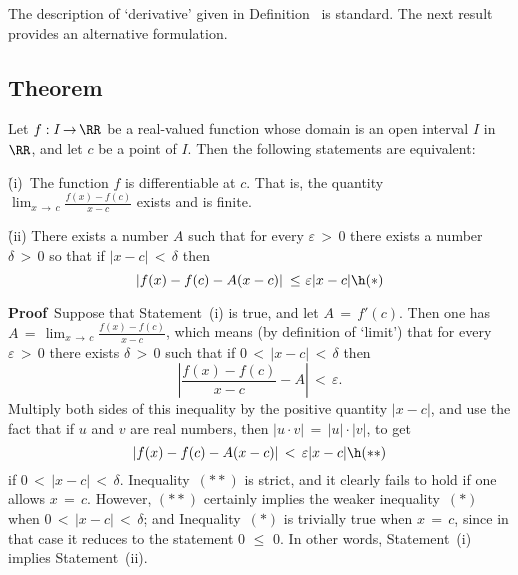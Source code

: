         The description of `derivative' given in Definition~ is standard.
    The next result provides an alternative formulation.

\V

             \subsection{\small{\bf Theorem}}
            \label{ThmE55.20}

        Let $f:I \,{\rightarrow}\, {\RR}$ be a real-valued function whose domain is an open interval $I$ in ${\RR}$, and let $c$ be a point of $I$.
    Then the following statements are equivalent:

        \h (i)\, The function $f$ is differentiable at $c$. That is, the quantity ${\displaystyle \lim_{x \,{\rightarrow}\, c} \frac{f(x)-f(c)}{x-c}}$ exists and is finite.

        \h (ii) There exists a number $A$ such that for every ${\varepsilon}\,>\,0$ there exists a number ${\delta}\,>\,0$ so that if $|x-c|\,<\,{\delta}$ then
        \begin{displaymath}
        \left|f(x) - f(c) - A(x-c)\right|\,\,{\leq}\,\,{\varepsilon}|x-c| \h ({\ast})
        \end{displaymath}

\V

        {\bf Proof}\, Suppose that Statement~(i) is true, and let $A \,=\, f'(c)$. Then one has $A \,=\, \lim_{x \,{\rightarrow}\, c} {\displaystyle \frac{f(x)-f(c)}{x-c}}$, which means (by definition of `limit') that for every ${\varepsilon}\,>\,0$ there exists ${\delta}\,>\,0$ such that if $0\,<\,|x-c|\,<\,{\delta}$ then
        \begin{displaymath}
        \left|\frac{f(x)-f(c)}{x-c} - A\right|\,<\,{\varepsilon}.
        \end{displaymath}
    Multiply both sides of this inequality by the positive quantity $|x-c|$, and use the fact that if $u$ and $v$ are real numbers,
    then $|u{\cdot}v| \,=\, |u|{\cdot}|v|$, to get
        \begin{displaymath}
        |f(x)-f(c) - A(x-c)|\,<\,{\varepsilon}|x-c| \h ({\ast}{\ast})
        \end{displaymath}
    if $0\,<\,|x-c|\,<\,{\delta}$.
    Inequality~$({\ast}{\ast})$ is strict, and it clearly fails to hold if one allows $x \,=\, c$.
    However, $({\ast}{\ast})$ certainly implies the weaker inequality~$({\ast})$ when $0\,<\,|x-c|\,<\,{\delta}$;
    and Inequality~$({\ast})$ is trivially true when $x \,=\, c$, since in that case it reduces to the statement $0\,\,{\leq}\,\,0$.
    In other words, Statement~(i) implies Statement~(ii).

